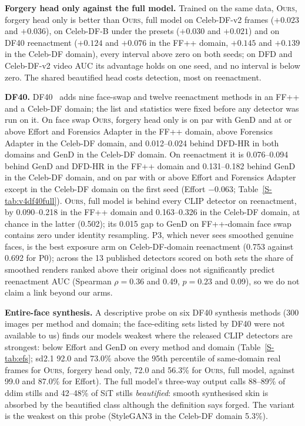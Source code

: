 \documentclass[conference]{IEEEtran}
\newcommand{\oursB}{\textsc{Ours}, forgery head only}
\newcommand{\oursF}{\textsc{Ours}, full model}
\begin{document}
\textbf{Forgery head only against the full model.} Trained on the same data, \oursB{} is better than \oursF{} on Celeb-DF-v2
frames ($+0.023$ and $+0.036$), on Celeb-DF-B under the presets ($+0.030$ and $+0.021$) and on DF40 reenactment ($+0.124$ and $+0.076$
in the FF++ domain, $+0.145$ and $+0.139$ in the Celeb-DF domain), every interval above zero on both seeds; on DFD and Celeb-DF-v2
video AUC its advantage holds on one seed, and no interval is below zero. The shared beautified head costs detection, most on
reenactment.

\textbf{DF40.} DF40~\cite{df40} adds nine face-swap and twelve reenactment methods in an FF++ and a Celeb-DF domain; the list
and statistics were fixed before any detector was run on it. On face swap \oursB{} is on par with GenD and at or above Effort and
Forensics Adapter in the FF++ domain, above Forensics Adapter in the Celeb-DF domain, and 0.012--0.024 behind DFD-HR in both
domains and GenD in the Celeb-DF domain. On reenactment it is 0.076--0.094 behind GenD and DFD-HR in the FF++ domain and
0.131--0.182 behind GenD in the Celeb-DF domain, and on par with or above Effort and Forensics Adapter except in the Celeb-DF domain
on the first seed (Effort $-0.063$; Table~\ref{S-tab:v4df40full}). \oursF{} is behind every CLIP detector on reenactment, by
0.090--0.218 in the FF++ domain and 0.163--0.326 in the Celeb-DF domain, at chance in the latter (0.502); its 0.015 gap to GenD on
FF++-domain face swap contains zero under identity resampling. P3, which never sees smoothed genuine faces, is the best exposure arm
on Celeb-DF-domain reenactment (0.753 against 0.692 for P0); across the 13 published detectors scored on both sets the share of
smoothed renders ranked above their original does not significantly predict reenactment AUC (Spearman $\rho=0.36$ and 0.49,
$p=0.23$ and 0.09), so we do not claim a link beyond our arms.

\textbf{Entire-face synthesis.} A descriptive probe on six DF40 synthesis methods (300 images per method and domain; the face-editing
sets listed by DF40 were not available to us) finds our models weakest where the released CLIP detectors are strongest: below
Effort and GenD on every method and domain (Table~\ref{S-tab:efs}; sd2.1 92.0 and 73.0\% above the 95th percentile of same-domain
real frames for \oursB{}, 72.0 and 56.3\% for \oursF{}, against 99.0 and 87.0\% for Effort). The full model's three-way output
calls 88--89\% of ddim stills and 42--48\% of SiT stills \emph{beautified}: smooth synthesised skin is absorbed by the beautified
class although the definition says forged. The variant is the weakest on this probe (StyleGAN3 in the Celeb-DF domain 5.3\%).
\end{document}
